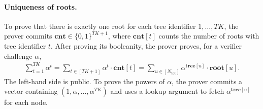 \paragraph{Uniqueness of roots.}
To prove that there is exactly one root for each tree identifier
$1,\ldots,TK$, the prover commits
$\mathbf{cnt}\in\{0,1\}^{TK+1}$, where $\mathbf{cnt}[t]$ counts the number of
roots with tree identifier $t$. After proving its booleanity, the prover proves,
for a verifier challenge $\alpha$,
\begin{align}
    \sum_{t=1}^{TK}\alpha^t
    =
    \sum_{t\in[TK+1]}\alpha^t\cdot\mathbf{cnt}[t]
    =
    \sum_{u\in[N_{\mathrm{tot}}]}\alpha^{\mathbf{tree}[u]}\cdot\mathbf{root}[u].
\end{align}
The left-hand side is public. To prove the powers of $\alpha$, the prover
commits a vector containing $(1,\alpha,\ldots,\alpha^{TK})$ and uses a lookup
argument to fetch $\alpha^{\mathbf{tree}[u]}$ for each node.

